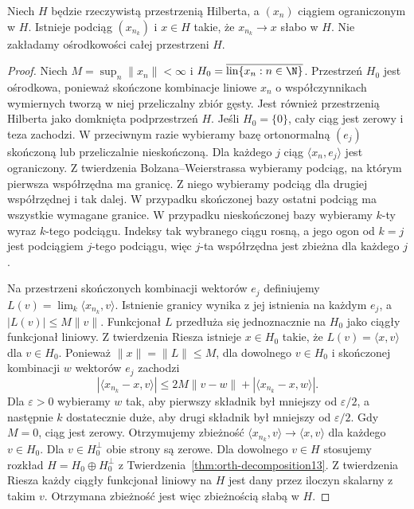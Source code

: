 \begin{lemat}
\label{lem:hilbert-weakseq16}
Niech $H$ będzie rzeczywistą przestrzenią Hilberta,
a $(x_n)$ ciągiem ograniczonym w $H$.
Istnieje podciąg $(x_{n_k})$ i $x\in H$ takie,
że $x_{n_k}\to x$ słabo w $H$.
Nie zakładamy ośrodkowości całej przestrzeni $H$.
\end{lemat}
\begin{proof}
Niech $M=\sup_n\|x_n\|<\infty$ i
$H_0=\overline{\operatorname{lin}\{x_n:n\in\N\}}$.
Przestrzeń $H_0$ jest ośrodkowa, ponieważ skończone
kombinacje liniowe $x_n$ o współczynnikach wymiernych
tworzą w niej przeliczalny zbiór gęsty. Jest również
przestrzenią Hilberta jako domknięta podprzestrzeń $H$.
Jeśli $H_0=\{0\}$, cały ciąg jest zerowy i teza zachodzi.
W przeciwnym razie wybieramy bazę ortonormalną $(e_j)$
skończoną lub przeliczalnie nieskończoną.
Dla każdego $j$ ciąg $\langle x_n,e_j\rangle$ jest ograniczony.
Z twierdzenia Bolzana--Weierstrassa wybieramy podciąg,
na którym pierwsza współrzędna ma granicę. Z niego
wybieramy podciąg dla drugiej współrzędnej i tak dalej.
W przypadku skończonej bazy ostatni podciąg ma
wszystkie wymagane granice. W przypadku nieskończonej
bazy wybieramy $k$-ty wyraz $k$-tego podciągu.
Indeksy tak wybranego ciągu rosną, a jego ogon
od $k=j$ jest podciągiem $j$-tego podciągu, więc
$j$-ta współrzędna jest zbieżna dla każdego $j$.

Na przestrzeni skończonych kombinacji wektorów $e_j$
definiujemy $L(v)=\lim_k\langle x_{n_k},v\rangle$.
Istnienie granicy wynika z jej istnienia na każdym $e_j$,
a $|L(v)|\le M\|v\|$. Funkcjonał $L$ przedłuża się
jednoznacznie na $H_0$ jako ciągły funkcjonał liniowy.
Z twierdzenia Riesza istnieje $x\in H_0$ takie,
że $L(v)=\langle x,v\rangle$ dla $v\in H_0$.
Ponieważ $\|x\|=\|L\|\le M$, dla dowolnego $v\in H_0$
i skończonej kombinacji $w$ wektorów $e_j$ zachodzi
\[
 |\langle x_{n_k}-x,v\rangle|
 \le 2M\|v-w\|+|\langle x_{n_k}-x,w\rangle|.
\]
Dla $\varepsilon>0$ wybieramy $w$ tak, aby pierwszy
składnik był mniejszy od $\varepsilon/2$, a następnie
$k$ dostatecznie duże, aby drugi składnik był mniejszy
od $\varepsilon/2$. Gdy $M=0$, ciąg jest zerowy.
Otrzymujemy zbieżność $\langle x_{n_k},v\rangle
\to\langle x,v\rangle$ dla każdego $v\in H_0$.
Dla $v\in H_0^\perp$ obie strony są zerowe.
Dla dowolnego $v\in H$ stosujemy rozkład
$H=H_0\oplus H_0^\perp$ z Twierdzenia~\ref{thm:orth-decomposition13}.
Z twierdzenia Riesza każdy ciągły funkcjonał liniowy
na $H$ jest dany przez iloczyn skalarny z takim $v$.
Otrzymana zbieżność jest więc zbieżnością słabą w $H$.
\end{proof}

